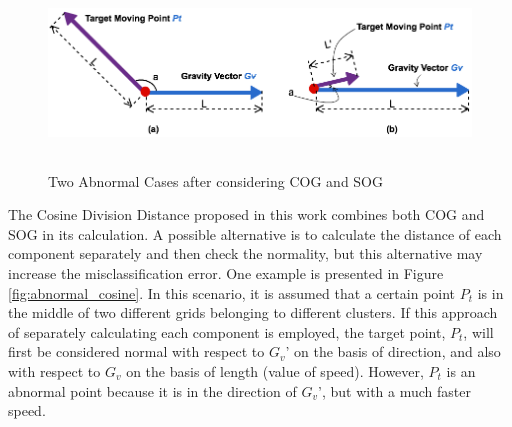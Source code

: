 \documentclass[12pt,glossary]{dalcsthesis}
\begin{document}
\begin{figure}[!htb]
\centering
\includegraphics[width=14cm,height=5cm]{abnormalSpeedDirection.png}
\caption{Two Abnormal Cases after considering COG and SOG}
\label{fig:abnormal_cogsog}
\end{figure}



The Cosine Division Distance proposed in this work combines both COG and SOG in its calculation. A possible alternative is to calculate the distance of each component separately and then check the normality, but this alternative may increase the misclassification error. One example is presented in Figure \ref{fig:abnormal_cosine}. In this scenario, it is assumed that a certain point $P_t$ is in the middle of two different grids belonging to different clusters. If this approach of separately calculating each component is employed, the target point, $P_t$, will first be considered normal with respect to $G_v$' on the basis of direction, and also with respect to $G_v$ on the basis of length (value of speed).
However, $P_t$ is an abnormal point because it is in the direction of $G_v$', but with a much faster speed.
\end{document}
